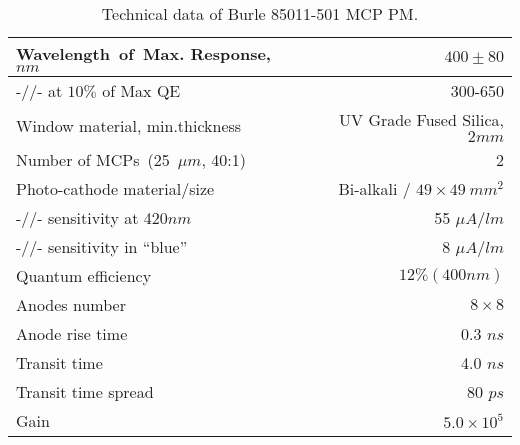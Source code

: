 \begin{table}[htbp]
\begin{center}
\begin{tabular}{|l|r|} \hline
Wavelength~of~Max. Response, $nm$  &      $400\pm80$ \\\hline
-//- at  $10\%$ of Max QE                & 300-650 \\\hline
Window material, min.thickness &  UV Grade Fused Silica, $2mm$ \\\hline
Number of MCPs~(25~$\mu m$, 40:1)    &   2\\\hline
Photo-cathode material/size & Bi-alkali / $49\times49~mm^2$\\\hline
-//- sensitivity at 420$nm$   &  55 $\mu A/lm$ \\ \hline
-//- sensitivity in  ``blue''&  8 $\mu A/lm$ \\ \hline
Quantum efficiency & $12\%(400nm)$ \\ \hline
Anodes number & $8\times8$ \\ \hline
Anode rise time & 0.3 $ns$ \\ \hline
Transit time & 4.0 $ns$ \\ \hline
Transit time spread &  80 $ps$  \\ \hline
Gain & $5.0 \times 10^5$ \\ \hline
\end{tabular}
\caption{Technical data of Burle 85011-501 MCP PM.\label{85011}}
\end{center}
\end{table}




